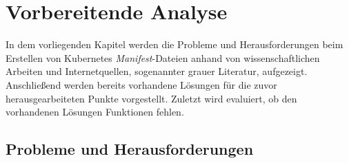 \chapter{Vorbereitende Analyse}\label{ch:preparation-analysis}

In dem vorliegenden Kapitel werden die Probleme und Herausforderungen beim Erstellen von Kubernetes \textit{Manifest}-Dateien anhand von wissenschaftlichen Arbeiten
und Internetquellen, sogenannter grauer Literatur, aufgezeigt. Anschließend werden bereits vorhandene Lösungen für die zuvor herausgearbeiteten Punkte vorgestellt.
Zuletzt wird evaluiert, ob den vorhandenen Lösungen Funktionen fehlen.

\section{Probleme und Herausforderungen}

